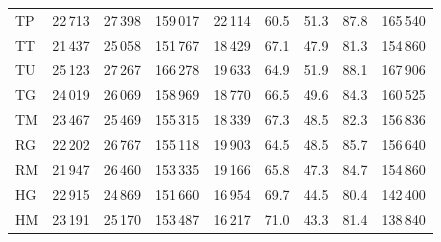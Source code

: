 \begin{minipage}{\textwidth}
\begin{tabular*}{\textwidth}{@{\extracolsep{\fill}}lrrrrrrrr@{}}
TP & 22\,713 & 27\,398 & 159\,017 & 22\,114 & 60.5 & 51.3 & 87.8 & 165\,540\\
TT & 21\,437 & 25\,058 & 151\,767 & 18\,429 & 67.1 & 47.9 & 81.3 & 154\,860\\
TU & 25\,123 & 27\,267 & 166\,278 & 19\,633 & 64.9 & 51.9 & 88.1 & 167\,906\\
TG & 24\,019 & 26\,069 & 158\,969 & 18\,770 & 66.5 & 49.6 & 84.3 & 160\,525\\
TM & 23\,467 & 25\,469 & 155\,315 & 18\,339 & 67.3 & 48.5 & 82.3 & 156\,836\\
RG & 22\,202 & 26\,767 & 155\,118 & 19\,903 & 64.5 & 48.5 & 85.7 & 156\,640\\
RM & 21\,947 & 26\,460 & 153\,335 & 19\,166 & 65.8 & 47.3 & 84.7 & 154\,860\\
HG & 22\,915 & 24\,869 & 151\,660 & 16\,954 & 69.7 & 44.5 & 80.4 & 142\,400\\
HM & 23\,191 & 25\,170 & 153\,487 & 16\,217 & 71.0 & 43.3 & 81.4 & 138\,840\\
\bottomrule\end{tabular*}
\end{minipage}\par\medskip
